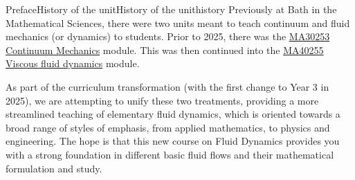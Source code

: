 \documentclass[oneside,10pt,]{book}
\numberwithin{equation}{section}
\begin{document}
%
%
\typeout{************************************************}
\typeout{************************************************}
%
\begin{preface}{Preface}{History of the unit}{}{History of the unit}{}{}{history}
Previously at Bath in the Mathematical Sciences, there were two units meant to teach continuum and fluid mechanics (or dynamics) to students. Prior to 2025, there was the \href{https://www.bath.ac.uk/catalogues/2024-2025/ma/MA30253.html}{MA30253 Continuum Mechanics} module. This was then continued into the \href{https://www.bath.ac.uk/catalogues/2024-2025/ma/MA40255.html}{MA40255 Viscous fluid dynamics} module.%
\par
As part of the curriculum transformation (with the first change to Year 3 in 2025), we are attempting to unify these two treatments, providing a more streamlined teaching of elementary fluid dynamics, which is oriented towards a broad range of styles of emphasis, from applied mathematics, to physics and engineering. The hope is that this new course on Fluid Dynamics provides you with a strong foundation in different basic fluid flows and their mathematical formulation and study.%
\end{preface}
%
%
\typeout{************************************************}
\typeout{************************************************}
%
\end{document}
